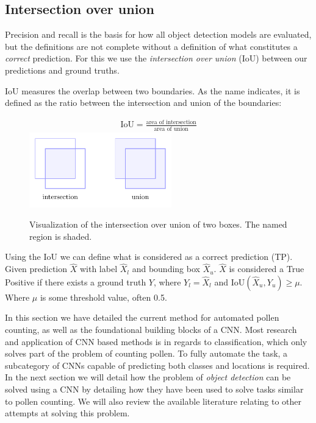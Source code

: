 \subsection{Intersection over union}

Precision and recall is the basis for how all object detection models are evaluated, but the definitions are not complete without a definition of what constitutes a \textit{correct} prediction.
For this we use the \textit{intersection over union} (IoU) between our predictions and ground truths.

IoU measures the overlap between two boundaries.
As the name indicates, it is defined as the ratio between the intersection and union of the boundaries:

\begin{figure}[htb]
  \centering
  \begin{gather*}
    \text{IoU}=\frac{\text{area of intersection}}{\text{area of union}}
  \end{gather*}
  \includegraphics[width=0.55\textwidth]{figs/iou.pdf}
\caption[Intersection over union]{Visualization of the intersection over union of two boxes.
The named region is shaded.}\label{fig:iou}
\end{figure}

Using the IoU we can define what is considered as a correct prediction (TP).
Given prediction \(\hat{X}\) with label \(\hat{X}_l\) and bounding box \(\hat{X}_u\). \(\hat{X}\) is considered a True Positive if there exists a ground truth \(Y\), where \(Y_{l}=\hat{X}_l\) and \(\text{IoU}(\hat{X}_u, Y_{u})\ge \mu \).
Where \( \mu \) is some threshold value, often 0.5.


In this section we have detailed the current method for automated pollen counting, as well as the foundational building blocks of a CNN\@.
Most research and application of CNN based methods is in regards to classification, which only solves part of the problem of counting pollen.
To fully automate the task, a subcategory of CNNs capable of predicting both classes and locations is required.
In the next section we will detail how the problem of \textit{object detection} can be solved using a CNN by detailing how they have been used to solve tasks similar to pollen counting.
We will also review the available literature relating to other attempts at solving this problem.



